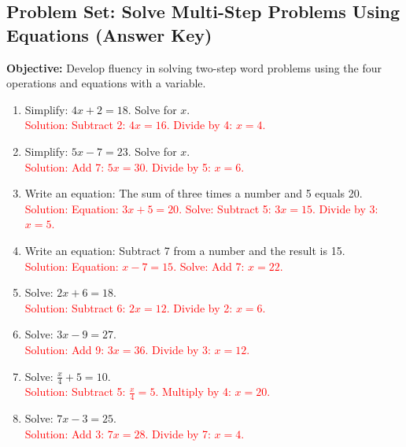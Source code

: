 \documentclass[12pt]{article}
\title{}
\date{}
\begin{document}
\subsection*{Problem Set: Solve Multi-Step Problems Using Equations (Answer Key)}
\onehalfspacing

\begin{tcolorbox}[colframe=black!40, colback=gray!5, 
coltitle=black, colbacktitle=black!20, fonttitle=\bfseries\Large, 
title=Learning Objective, halign title=center, left=5pt, right=5pt, top=5pt, bottom=15pt]
\textbf{Objective:} Develop fluency in solving two-step word problems using the four operations and equations with a variable.
\end{tcolorbox}

\begin{tcolorbox}[colframe=black!60, colback=white, 
coltitle=black, colbacktitle=black!15, fonttitle=\bfseries\Large, 
title=Exercises, halign title=center, left=10pt, right=10pt, top=10pt, bottom=60pt]
\begin{enumerate}[itemsep=3em]
    \item Simplify: \( 4x + 2 = 18 \). Solve for \(x\).\\
    \textcolor{red}{Solution: Subtract 2: \( 4x = 16 \). Divide by 4: \( x = 4 \).}

    \item Simplify: \( 5x - 7 = 23 \). Solve for \(x\).\\
    \textcolor{red}{Solution: Add 7: \( 5x = 30 \). Divide by 5: \( x = 6 \).}

    \item Write an equation: The sum of three times a number and 5 equals 20.\\
    \textcolor{red}{Solution: Equation: \( 3x + 5 = 20 \). Solve: Subtract 5: \( 3x = 15 \). Divide by 3: \( x = 5 \).}

    \item Write an equation: Subtract 7 from a number and the result is 15.\\
    \textcolor{red}{Solution: Equation: \( x - 7 = 15 \). Solve: Add 7: \( x = 22 \).}

    \item Solve: \( 2x + 6 = 18 \).\\
    \textcolor{red}{Solution: Subtract 6: \( 2x = 12 \). Divide by 2: \( x = 6 \).}

    \item Solve: \( 3x - 9 = 27 \).\\
    \textcolor{red}{Solution: Add 9: \( 3x = 36 \). Divide by 3: \( x = 12 \).}

    \item Solve: \( \frac{x}{4} + 5 = 10 \).\\
    \textcolor{red}{Solution: Subtract 5: \( \frac{x}{4} = 5 \). Multiply by 4: \( x = 20 \).}

    \item Solve: \( 7x - 3 = 25 \).\\
    \textcolor{red}{Solution: Add 3: \( 7x = 28 \). Divide by 7: \( x = 4 \).}
\end{enumerate}
\end{tcolorbox}
\end{document}
